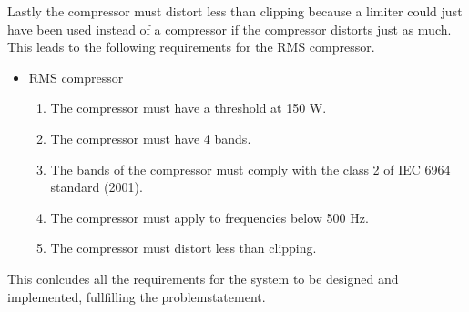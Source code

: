 Lastly the compressor must distort less than clipping because a limiter could just have been used instead of a compressor if the compressor distorts just as much. This leads to the following requirements for the RMS compressor.     

\begin{itemize}
\item RMS compressor
\begin{enumerate}
\item [\textlabel{9}{Threshold}] The compressor must have a threshold at 150 W.\\
\item [\textlabel{10}{bands}] The compressor must have 4 bands.\\
\item [\textlabel{11}{standardband}] The bands of the compressor must comply with the class 2 of IEC 6964 standard (2001).\\
\item [\textlabel{12}{500below}] The compressor must apply to frequencies below 500 Hz.\\
\item [\textlabel{13}{clipping}] The compressor must distort less than clipping.
\end{enumerate}
\end{itemize}

This conlcudes all the requirements for the system to be designed and implemented, fullfilling the problemstatement. 



